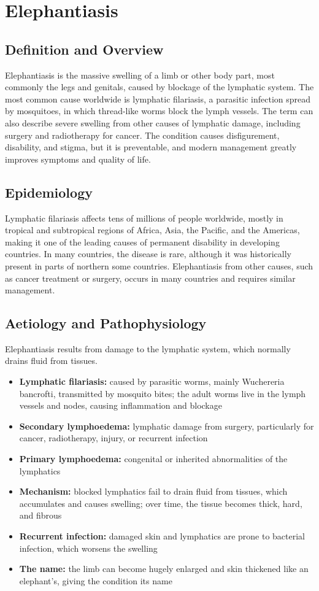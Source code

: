 \chapter{Elephantiasis}

\section*{Definition and Overview}
Elephantiasis is the massive swelling of a limb or other body part, most commonly the legs and genitals, caused by blockage of the lymphatic system. The most common cause worldwide is lymphatic filariasis, a parasitic infection spread by mosquitoes, in which thread-like worms block the lymph vessels. The term can also describe severe swelling from other causes of lymphatic damage, including surgery and radiotherapy for cancer. The condition causes disfigurement, disability, and stigma, but it is preventable, and modern management greatly improves symptoms and quality of life.

\section*{Epidemiology}
Lymphatic filariasis affects tens of millions of people worldwide, mostly in tropical and subtropical regions of Africa, Asia, the Pacific, and the Americas, making it one of the leading causes of permanent disability in developing countries. In many countries, the disease is rare, although it was historically present in parts of northern some countries. Elephantiasis from other causes, such as cancer treatment or surgery, occurs in many countries and requires similar management.

\section*{Aetiology and Pathophysiology}
Elephantiasis results from damage to the lymphatic system, which normally drains fluid from tissues.
\begin{itemize}
    \item \textbf{Lymphatic filariasis:} caused by parasitic worms, mainly Wuchereria bancrofti, transmitted by mosquito bites; the adult worms live in the lymph vessels and nodes, causing inflammation and blockage
    \item \textbf{Secondary lymphoedema:} lymphatic damage from surgery, particularly for cancer, radiotherapy, injury, or recurrent infection
    \item \textbf{Primary lymphoedema:} congenital or inherited abnormalities of the lymphatics
    \item \textbf{Mechanism:} blocked lymphatics fail to drain fluid from tissues, which accumulates and causes swelling; over time, the tissue becomes thick, hard, and fibrous
    \item \textbf{Recurrent infection:} damaged skin and lymphatics are prone to bacterial infection, which worsens the swelling
    \item \textbf{The name:} the limb can become hugely enlarged and skin thickened like an elephant's, giving the condition its name
\end{itemize}

